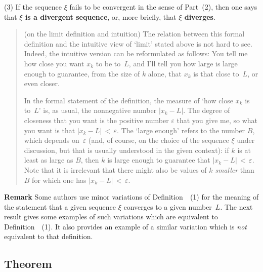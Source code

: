 \V

        (3) If the sequence ${\xi}$ fails to be convergent in the sense of Part~(2), then one says that {\bf ${\xi}$ is a divergent sequence},
    or, more briefly, that {\bf ${\xi}$ diverges}.


\VV

\begin{quotation}
{\footnotesize  \underline{\Note} (on the limit definition and intuition)
        The relation between this formal definition and the intuitive view of `limit' stated above is not hard to see.
    Indeed, the intuitive version can be reformulated as follows: You tell me how close you want $x_{k}$ to be to~$L$,
    and I'll tell you how large is large enough to guarantee, from the size of $k$ alone, that $x_{k}$ is that close to~$L$, or even closer.

        In the formal statement of the definition, the measure of `how close $x_{k}$ is to~$L$' is, as usual, the nonnegative number $|x_{k}-L|$.
    The degree of closeness that you want is the positive number ${\varepsilon}$ that you give me, so what you want is that $|x_{k}-L|\,<\,{\varepsilon}$.
    The `large enough' refers to the number $B$, which depends on~${\varepsilon}$ (and, of course, on the choice of the sequence ${\xi}$ under discussion,
    but that is usually understood in the given context): if $k$ is at least as large as $B$, then $k$ is large enough to guarantee that $|x_{k}-L|\,<\,{\varepsilon}$.
    Note that it is irrelevant that there might also be values of $k$ {\em smaller} than $B$ for which one has $|x_{k}-L|\,<\,{\varepsilon}$.
}%
\end{quotation}


\VV

       {\bf Remark} Some authors use minor variations of Definition~~(1) for the meaning of the statement that a given sequence ${\xi}$ converges to a given number~$L$.
    The next result gives some examples of such variations which are equivalent to Definition~~(1).
    It also provides an example of a similar variation which is {\em not} equivalent to that definition.
    

            \subsection{\small{\bf Theorem}}
            \label{ThmC10.12}

